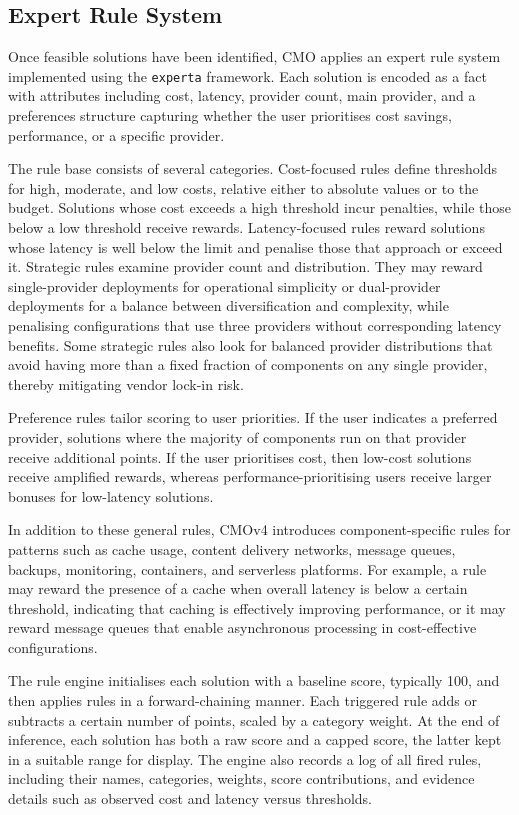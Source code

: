 \documentclass[journal]{IEEEtran}
\newcommand{\cmo}{CMO\xspace}
\newcommand{\cmofour}{CMOv4\xspace}
\begin{document}
\subsection{Expert Rule System}
\label{sec:expert}

Once feasible solutions have been identified, \cmo applies an expert rule
system implemented using the \texttt{experta} framework. Each solution is
encoded as a fact with attributes including cost, latency, provider count, main
provider, and a preferences structure capturing whether the user prioritises
cost savings, performance, or a specific provider.

The rule base consists of several categories. Cost-focused rules define
thresholds for high, moderate, and low costs, relative either to absolute
values or to the budget. Solutions whose cost exceeds a high threshold incur
penalties, while those below a low threshold receive rewards. Latency-focused
rules reward solutions whose latency is well below the limit and penalise those
that approach or exceed it. Strategic rules examine provider count and
distribution. They may reward single-provider deployments for operational
simplicity or dual-provider deployments for a balance between diversification
and complexity, while penalising configurations that use three providers without
corresponding latency benefits. Some strategic rules also look for balanced
provider distributions that avoid having more than a fixed fraction of
components on any single provider, thereby mitigating vendor lock-in risk.

Preference rules tailor scoring to user priorities. If the user indicates a
preferred provider, solutions where the majority of components run on that
provider receive additional points. If the user prioritises cost, then low-cost
solutions receive amplified rewards, whereas performance-prioritising users
receive larger bonuses for low-latency solutions.

In addition to these general rules, \cmofour introduces component-specific
rules for patterns such as cache usage, content delivery networks, message
queues, backups, monitoring, containers, and serverless platforms. For example,
a rule may reward the presence of a cache when overall latency is below a
certain threshold, indicating that caching is effectively improving performance,
or it may reward message queues that enable asynchronous processing in
cost-effective configurations.

The rule engine initialises each solution with a baseline score, typically 100,
and then applies rules in a forward-chaining manner. Each triggered rule adds
or subtracts a certain number of points, scaled by a category weight. At the
end of inference, each solution has both a raw score and a capped score, the
latter kept in a suitable range for display. The engine also records a log of
all fired rules, including their names, categories, weights, score
contributions, and evidence details such as observed cost and latency versus
thresholds.
\end{document}
